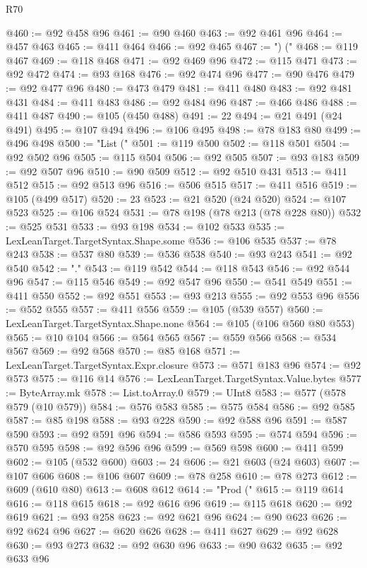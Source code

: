 \begin{lexlean}{R70}
\begin{coremodule}
@460 := @92 @458 @96
@461 := @90 @460
@463 := @92 @461 @96
@464 := @457 @463
@465 := @411 @464
@466 := @92 @465
@467 := ") ("
@468 := @119 @467
@469 := @118 @468
@471 := @92 @469 @96
@472 := @115 @471
@473 := @92 @472
@474 := @93 @168
@476 := @92 @474 @96
@477 := @90 @476
@479 := @92 @477 @96
@480 := @473 @479
@481 := @411 @480
@483 := @92 @481 @431
@484 := @411 @483
@486 := @92 @484 @96
@487 := @466 @486
@488 := @411 @487
@490 := @105 (@450 @488)
@491 := 22
@494 := @21 @491 (@24 @491)
@495 := @107 @494
@496 := @106 @495
@498 := @78 @183 @80
@499 := @496 @498
@500 := "List ("
@501 := @119 @500
@502 := @118 @501
@504 := @92 @502 @96
@505 := @115 @504
@506 := @92 @505
@507 := @93 @183
@509 := @92 @507 @96
@510 := @90 @509
@512 := @92 @510 @431
@513 := @411 @512
@515 := @92 @513 @96
@516 := @506 @515
@517 := @411 @516
@519 := @105 (@499 @517)
@520 := 23
@523 := @21 @520 (@24 @520)
@524 := @107 @523
@525 := @106 @524
@531 := @78 @198 (@78 @213 (@78 @228 @80))
@532 := @525 @531
@533 := @93 @198
@534 := @102 @533
@535 := LexLeanTarget.TargetSyntax.Shape.some
@536 := @106 @535
@537 := @78 @243
@538 := @537 @80
@539 := @536 @538
@540 := @93 @243
@541 := @92 @540
@542 := "."
@543 := @119 @542
@544 := @118 @543
@546 := @92 @544 @96
@547 := @115 @546
@549 := @92 @547 @96
@550 := @541 @549
@551 := @411 @550
@552 := @92 @551
@553 := @93 @213
@555 := @92 @553 @96
@556 := @552 @555
@557 := @411 @556
@559 := @105 (@539 @557)
@560 := LexLeanTarget.TargetSyntax.Shape.none
@564 := @105 (@106 @560 @80 @553)
@565 := @10 @104
@566 := @564 @565
@567 := @559 @566
@568 := @534 @567
@569 := @92 @568
@570 := @85 @168
@571 := LexLeanTarget.TargetSyntax.Expr.closure
@573 := @571 @183 @96
@574 := @92 @573
@575 := @116 @14
@576 := LexLeanTarget.TargetSyntax.Value.bytes
@577 := ByteArray.mk
@578 := List.toArray.{0}
@579 := UInt8
@583 := @577 (@578 @579 (@10 @579))
@584 := @576 @583
@585 := @575 @584
@586 := @92 @585
@587 := @85 @198
@588 := @93 @228
@590 := @92 @588 @96
@591 := @587 @590
@593 := @92 @591 @96
@594 := @586 @593
@595 := @574 @594
@596 := @570 @595
@598 := @92 @596 @96
@599 := @569 @598
@600 := @411 @599
@602 := @105 (@532 @600)
@603 := 24
@606 := @21 @603 (@24 @603)
@607 := @107 @606
@608 := @106 @607
@609 := @78 @258
@610 := @78 @273
@612 := @609 (@610 @80)
@613 := @608 @612
@614 := "Prod ("
@615 := @119 @614
@616 := @118 @615
@618 := @92 @616 @96
@619 := @115 @618
@620 := @92 @619
@621 := @93 @258
@623 := @92 @621 @96
@624 := @90 @623
@626 := @92 @624 @96
@627 := @620 @626
@628 := @411 @627
@629 := @92 @628
@630 := @93 @273
@632 := @92 @630 @96
@633 := @90 @632
@635 := @92 @633 @96

\end{coremodule}
\end{lexlean}
